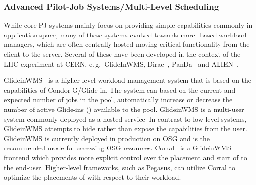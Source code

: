 \documentclass{sig-alternate}
\begin{document}
\subsubsection*{Advanced Pilot-Job Systems/Multi-Level Scheduling}

 

While core PJ systems mainly focus on providing simple \pilot capabilities 
commonly in application space, many of these systems evolved towards more 
\pilot-based workload managers, which are often centrally hosted moving 
critical functionality from the client to the server. Several of these have 
been developed in the context of the LHC experiment at CERN, e.\,g.\ 
GlideInWMS, Dirac~\cite{1742-6596-219-6-062049}, 
PanDa~\cite{1742-6596-331-7-072069} and ALIEN~\cite{1742-6596-119-6-062012}.


GlideinWMS~\cite{1742-6596-119-6-062044} is a higher-level workload management
system that is based on the \pilot capabilities of Condor-G/Glide-in. The
system can based on the current and expected number of jobs in the pool,
automatically increase or decrease the number of active Glide-ins (\pilots)
available to the pool. GlideinWMS is a multi-user \pilotjob system commonly
deployed as a hosted service. In contrast to low-level \pilotjob systems,
GlideinWMS attempts to hide rather than expose the \pilot capabilities from
the user. GlideinWMS is currently deployed in production on OSG and is the
recommended mode for accessing OSG resources.
Corral~\cite{Rynge:2011:EUG:2116259.2116599} is a GlideinWMS frontend which
provides more explicit control over the placement and start of \pilots to the
end-user. Higher-level frameworks, such as Pegasus, can utilize Corral to
optimize the placements of \pilots with respect to their workload.
\end{document}
